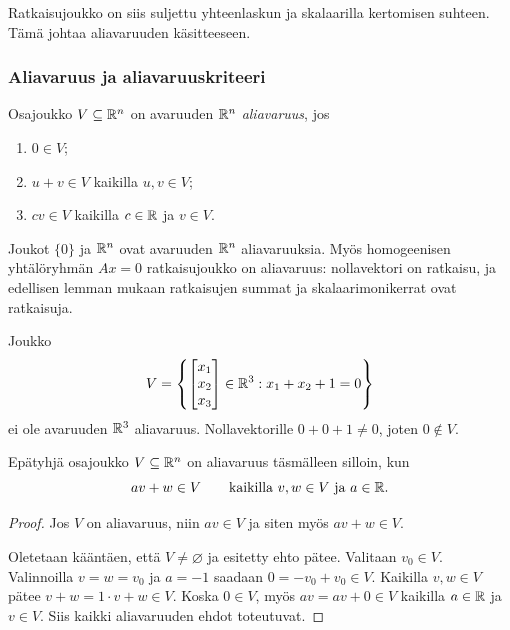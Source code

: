 \documentclass[11pt,a4paper]{amsart}
\begin{document}
  Ratkaisujoukko on siis suljettu yhteenlaskun ja skalaarilla
  kertomisen suhteen. Tämä johtaa aliavaruuden käsitteeseen.

  \subsubsection*{Aliavaruus ja aliavaruuskriteeri}

  \begin{definition}[Aliavaruus]
    Osajoukko $V\subseteq\mathbb{R}^n$ on avaruuden $\mathbb{R}^n$
    \emph{aliavaruus}, jos
    \begin{enumerate}
      \item $0\in V$;
      \item $u+v\in V$ kaikilla $u,v\in V$;
      \item $cv\in V$ kaikilla $c\in\mathbb{R}$ ja $v\in V$.
    \end{enumerate}
  \end{definition}

  \begin{example}
    Joukot $\{0\}$ ja $\mathbb{R}^n$ ovat avaruuden $\mathbb{R}^n$ aliavaruuksia.
    Myös homogeenisen yhtälöryhmän $Ax=0$ ratkaisujoukko on
    aliavaruus: nollavektori on ratkaisu, ja edellisen lemman mukaan
    ratkaisujen summat ja skalaarimonikerrat ovat ratkaisuja.
  \end{example}

  \begin{example}
    Joukko
    \[
      V=\left\{
        \begin{bmatrix}x_1\\x_2\\x_3
        \end{bmatrix}\in\mathbb{R}^3:
        x_1+x_2+1=0
      \right\}
    \]
    ei ole avaruuden $\mathbb{R}^3$ aliavaruus. Nollavektorille
    $0+0+1\ne0$, joten $0\notin V$.
  \end{example}

  \begin{lemma}[Aliavaruuskriteeri]\label{lem:subspace-criterion}
    Epätyhjä osajoukko $V\subseteq\mathbb{R}^n$ on aliavaruus täsmälleen
    silloin, kun
    \[
      av+w\in V\qquad
      \text{kaikilla }v,w\in V\text{ ja }a\in\mathbb{R}.
    \]
  \end{lemma}
  \begin{proof}
    Jos $V$ on aliavaruus, niin $av\in V$ ja siten myös
    $av+w\in V$.

    Oletetaan kääntäen, että $V\ne\varnothing$ ja esitetty ehto
    pätee. Valitaan $v_0\in V$. Valinnoilla $v=w=v_0$ ja $a=-1$
    saadaan $0=-v_0+v_0\in V$. Kaikilla $v,w\in V$ pätee
    $v+w=1\cdot v+w\in V$. Koska $0\in V$, myös
    $av=av+0\in V$ kaikilla $a\in\mathbb{R}$ ja $v\in V$.
    Siis kaikki aliavaruuden ehdot toteutuvat.
  \end{proof}
\end{document}
